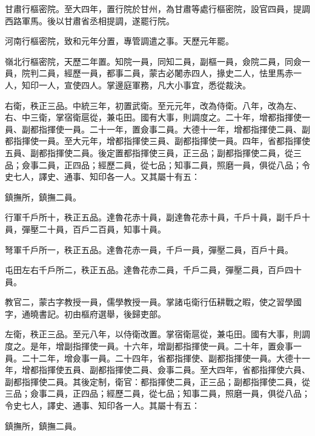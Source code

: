 \begin{pinyinscope}
 甘肅行樞密院。至大四年，置行院於甘州，為甘肅等處行樞密院，設官四員，提調西路軍馬。後以甘肅省丞相提調，遂罷行院。



 河南行樞密院，致和元年分置，專管調遣之事。天歷元年罷。



 嶺北行樞密院，天歷二年置。知院一員，同知二員，副樞一員，僉院二員，同僉一員，院判二員，經歷一員，都事二員，蒙古必闍赤四人，掾史二人，怯里馬赤一人，知印一人，宣使四人。掌邊庭軍務，凡大小事宜，悉從裁決。



 右衛，秩正三品。中統三年，初置武衛。至元元年，改為侍衛。八年，改為左、右、中三衛，掌宿衛扈從，兼屯田。國有大事，則調度之。二十年，增都指揮使一員、副都指揮使一員。二十一年，置僉事二員。大德十一年，增都指揮使二員、副都指揮使一員。至大元年，增都指揮使三員、副都指揮使一員。四年，省都指揮使五員、副都指揮使二員。後定置都指揮使三員，正三品；副都指揮使二員，從三品；僉事二員，正四品；經歷二員，從七品；知事二員，照磨一員，俱從八品；令史七人，譯史、通事、知印各一人。又其屬十有五：



 鎮撫所，鎮撫二員。



 行軍千戶所十，秩正五品。達魯花赤十員，副達魯花赤十員，千戶十員，副千戶十員，彈壓二十員，百戶二百員，知事十員。



 弩軍千戶所一，秩正五品。達魯花赤一員，千戶一員，彈壓二員，百戶十員。



 屯田左右千戶所二，秩正五品。達魯花赤二員，千戶二員，彈壓二員，百戶四十員。



 教官二，蒙古字教授一員，儒學教授一員。掌諸屯衛行伍耕戰之暇，使之習學國字，通曉書記。初由樞府選舉，後歸吏部。



 左衛，秩正三品。至元八年，以侍衛改置。掌宿衛扈從，兼屯田。國有大事，則調度之。是年，增副指揮使一員。十六年，增副都指揮使一員。二十年，置僉事一員。二十二年，增僉事一員。二十四年，省都指揮使、副都指揮使一員。大德十一年，增都指揮使五員、副都指揮使二員、僉事二員。至大四年，省都指揮使六員、副都指揮使二員。其後定制，衛官：都指揮使二員，正三品；副都指揮使二員，從三品；僉事二員，正四品；經歷二員，從七品；知事二員，照磨一員，俱從八品；令史七人，譯史、通事、知印各一人。其屬十有五：



 鎮撫所，鎮撫二員。




\end{pinyinscope}
